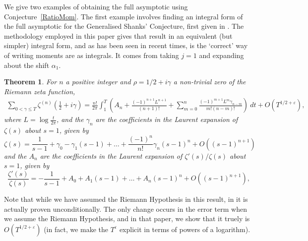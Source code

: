 \documentclass[12pt,a4paper,reqno]{amsart}
\newtheorem{theorem}{Theorem}
\theoremstyle{remark}
\numberwithin{equation}{section}
\begin{document}
We give two examples of obtaining the full asymptotic using Conjecture~\ref{RatioMom}. The first example involves finding an integral form of the full asymptotic for the Generalised Shanks' Conjecture, first given in \cite{HugPC22}. The methodology employed in this paper gives that result in an equivalent (but simpler) integral form, and as has been seen in recent times, is the `correct' way of writing moments are as integrals.  It comes from taking $j=1$ and expanding about the shift $\alpha_1$.
\begin{theorem}\label{thm:Shanks}
	For $n$ a positive integer and $\rho=1/2 + i\gamma$ a non-trivial zero of the Riemann zeta function,
	\begin{multline*}
		\sum_{0 < \gamma \leq T} \zeta ^{(n)} \left(\frac{1}{2} + i \gamma \right) =  \frac{n!}{2 \pi} \int_{1}^{T} \left( A_n + \frac{(-1)^{n+1} L^{n+1}}{(n+1)!} + \sum_{m=0}^{n} \frac{(-1)^{m+1} L^m \gamma_{n-m}}{m! (n-m)!} \right) \ dt + O \left( T^{1/2 +\varepsilon} \right),
	\end{multline*}
	where $L = \log \frac{t}{2\pi}$, and the $\gamma_n$ are the coefficients in the Laurent expansion of $\zeta (s)$ about $s=1$, given by
    \begin{equation}\label{eq:zetalaur}
    \zeta(s) = \frac{1}{s-1} +\gamma_0 - \gamma_1 (s-1) +\dots + \frac{(-1)^n}{n!}\gamma_n (s-1)^n +O\left((s-1)^{n+1}\right)
    \end{equation}
    and the $A_n$ are the coefficients in the Laurent expansion of $\zeta' (s)/\zeta (s)$ about $s=1$, given by
    \begin{equation*}
    \frac{\zeta ' (s)}{\zeta (s)} = - \frac{1}{s-1} +A_0 + A_1 (s-1) + \dots + A_n (s-1)^n +O\left((s-1)^{n+1}\right),
    \end{equation*}
\end{theorem}
Note that while we have assumed the Riemann Hypothesis in this result, in \cite{HugPC22} it is actually proven unconditionally. The only change occurs in the error term when we assume the Riemann Hypothesis, and in that paper, we show that it truely is $O \left( T^{1/2 +\varepsilon} \right)$ (in fact, we make the $T^\varepsilon$ explicit in terms of powers of a logarithm).
\end{document}
